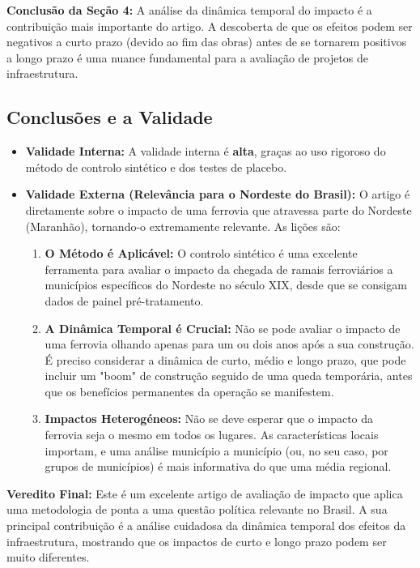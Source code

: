 \documentclass[12pt, a4paper]{article}
\begin{document}
\noindent\textbf{Conclusão da Seção 4:} A análise da dinâmica temporal do impacto é a contribuição mais importante do artigo. A descoberta de que os efeitos podem ser negativos a curto prazo (devido ao fim das obras) antes de se tornarem positivos a longo prazo é uma nuance fundamental para a avaliação de projetos de infraestrutura.

\subsection{Conclusões e a Validade}
\begin{itemize}
    \item \textbf{Validade Interna:} A validade interna é \textbf{alta}, graças ao uso rigoroso do método de controlo sintético e dos testes de placebo.
    \item \textbf{Validade Externa (Relevância para o Nordeste do Brasil):} O artigo é diretamente sobre o impacto de uma ferrovia que atravessa parte do Nordeste (Maranhão), tornando-o extremamente relevante. As lições são:
        \begin{enumerate}
            \item \textbf{O Método é Aplicável:} O controlo sintético é uma excelente ferramenta para avaliar o impacto da chegada de ramais ferroviários a municípios específicos do Nordeste no século XIX, desde que se consigam dados de painel pré-tratamento.
            \item \textbf{A Dinâmica Temporal é Crucial:} Não se pode avaliar o impacto de uma ferrovia olhando apenas para um ou dois anos após a sua construção. É preciso considerar a dinâmica de curto, médio e longo prazo, que pode incluir um "boom" de construção seguido de uma queda temporária, antes que os benefícios permanentes da operação se manifestem.
            \item \textbf{Impactos Heterogéneos:} Não se deve esperar que o impacto da ferrovia seja o mesmo em todos os lugares. As características locais importam, e uma análise município a município (ou, no seu caso, por grupos de municípios) é mais informativa do que uma média regional.
        \end{enumerate}
\end{itemize}

\noindent\textbf{Veredito Final:} Este é um excelente artigo de avaliação de impacto que aplica uma metodologia de ponta a uma questão política relevante no Brasil. A sua principal contribuição é a análise cuidadosa da dinâmica temporal dos efeitos da infraestrutura, mostrando que os impactos de curto e longo prazo podem ser muito diferentes. 
\end{document}
